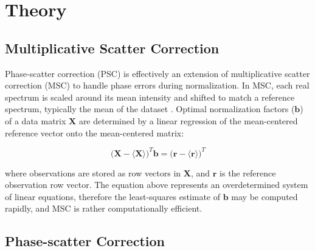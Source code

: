 \section{Theory}

\subsection{Multiplicative Scatter Correction}

\begin{doublespace}
Phase-scatter correction (PSC) is effectively an extension of multiplicative
scatter correction (MSC) to handle phase errors during normalization. In MSC,
each real spectrum is scaled around its mean intensity and shifted to match a
reference spectrum, typically the mean of the dataset \cite{fearn:cils2009}.
Optimal normalization factors ($\mathbf{b}$) of a data matrix $\mathbf{X}$ are
determined by a linear regression of the mean-centered reference vector onto
the mean-centered matrix:

\begin{equation}
\big( \mathbf{X} - \langle \mathbf{X} \rangle \big)^T \mathbf{b}
 = \big( \mathbf{r} - \langle \mathbf{r} \rangle \big)^T
\end{equation}

where observations are stored as row vectors in $\mathbf{X}$, and $\mathbf{r}$
is the reference observation row vector. The equation above represents an
overdetermined system of linear equations, therefore the least-squares estimate
of $\mathbf{b}$ may be computed rapidly, and MSC is rather computationally
efficient.
\end{doublespace}

\subsection{Phase-scatter Correction}

